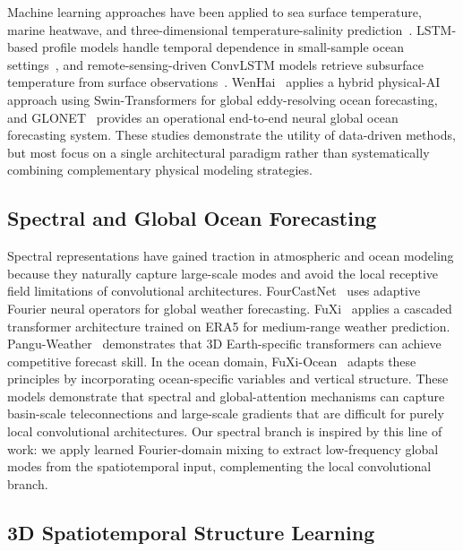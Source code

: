 \documentclass[conference]{IEEEtran}
\begin{document}
Machine learning approaches have been applied to sea surface temperature, marine heatwave, and three-dimensional temperature-salinity prediction~\cite{SunMiaoShenDuXueXiZaiHaiYangDaShuJuWaJueZhongDeYingYong2018,boninoMachineLearningMethods2024,YangJunGangJiYuYaoGanDeHaiYangSanWeiWenYanChangZhiNengTanCeYanJiuJinZhan2024}. LSTM-based profile models handle temporal dependence in small-sample ocean settings~\cite{FanPeiQinJiYuLSTMWangLuoDeHaiShuiWenDuPouMianYuBaoYanJiu2024}, and remote-sensing-driven ConvLSTM models retrieve subsurface temperature from surface observations~\cite{zhangImprovedMethodRetrieving2024}. WenHai~\cite{cuiWenHaiForecastingEddying2025} applies a hybrid physical-AI approach using Swin-Transformers for global eddy-resolving ocean forecasting, and GLONET~\cite{elAouniGLONETMercatorEndtoEnd2024} provides an operational end-to-end neural global ocean forecasting system. These studies demonstrate the utility of data-driven methods, but most focus on a single architectural paradigm rather than systematically combining complementary physical modeling strategies.

\subsection{Spectral and Global Ocean Forecasting}

Spectral representations have gained traction in atmospheric and ocean modeling because they naturally capture large-scale modes and avoid the local receptive field limitations of convolutional architectures. FourCastNet~\cite{pathak2022fourcastnet} uses adaptive Fourier neural operators for global weather forecasting. FuXi~\cite{chen2023fuxi} applies a cascaded transformer architecture trained on ERA5 for medium-range weather prediction. Pangu-Weather~\cite{bi2023accurate} demonstrates that 3D Earth-specific transformers can achieve competitive forecast skill. In the ocean domain, FuXi-Ocean~\cite{huangFuXiOceanGlobalOcean2025} adapts these principles by incorporating ocean-specific variables and vertical structure. These models demonstrate that spectral and global-attention mechanisms can capture basin-scale teleconnections and large-scale gradients that are difficult for purely local convolutional architectures. Our spectral branch is inspired by this line of work: we apply learned Fourier-domain mixing to extract low-frequency global modes from the spatiotemporal input, complementing the local convolutional branch.

\subsection{3D Spatiotemporal Structure Learning}
\end{document}
